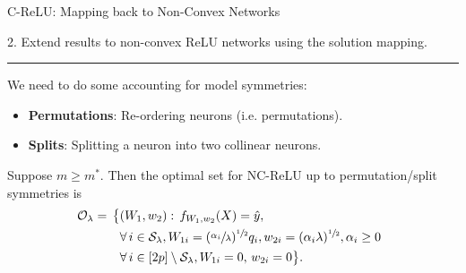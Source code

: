 \documentclass[usenames,dvipsnames,mathserif,notheorems]{beamer}
\newcommand{\horizontalrule}{
	{
			\vspace{-0.5em}
			\center \rule{\textwidth}{0.1em}
			\vspace{-0.2em}
		}
}
\newcommand{\bad}[1]{\textcolor{bad}{#1}}
\begin{document}
\begin{frame}{C-ReLU: Mapping back to Non-Convex Networks}

	{\raggedright
		\large
		2. Extend results to \bad{non-convex} ReLU networks
		using the solution mapping.
		\pause
	}
	\horizontalrule

	We need to do some accounting for \bad{model symmetries}:
	\pause
	\begin{itemize}
		\item \textbf{Permutations}: Re-ordering neurons (i.e. permutations).
		      \pause

		\item \textbf{Splits}: Splitting a neuron into two collinear neurons.
		      \pause
	\end{itemize}


	\begin{theorem}[Informal]
		Suppose \( m \geq m^* \).
		Then the optimal set for NC-ReLU up to
		\bad{permutation/split symmetries} is
		\vspace{-1ex}
		\begin{equation*}
			\begin{aligned}
				\hspace{-0.5em} \mathcal{O}_\lambda  = \,
				\big\{
				 & (W_1,  w_2) :
				\, f_{W_1, w_2}(X)  =  \hat y,                       \\
				 & \forall \, {i}  \in  \mathcal{S}_\lambda,
				W_{1i} = (\sfrac{\alpha_{i}}{\lambda})^{\sfrac{1}{2}} q_i,
				w_{2i} = (\alpha_i \lambda)^{\sfrac{1}{2}},
				\alpha_i \geq 0                                      \\
				 & \forall \, {i}  \in [2p] \setminus \mathcal{S}_\lambda,
				W_{1i} = 0, \, w_{2i} = 0
				\big\}.
			\end{aligned}
		\end{equation*}
	\end{theorem}

\end{frame}
\end{document}
